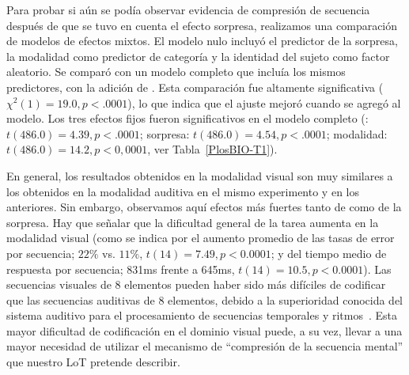 Para probar si aún se podía observar evidencia de compresión de secuencia después de que se tuvo en cuenta el efecto sorpresa, realizamos una comparación de modelos de efectos mixtos. El modelo nulo incluyó el predictor de la sorpresa, la modalidad como predictor de categoría y la identidad del sujeto como factor aleatorio. Se comparó con un modelo completo que incluía los mismos predictores, con la adición de \mdlbin. Esta comparación fue altamente significativa ($\chi^2 (1) = 19.0, p < .0001$), lo que indica que el ajuste mejoró cuando se agregó \mdlbin al modelo. Los tres efectos fijos fueron significativos en el modelo completo (\mdlbin: $t (486.0) = 4.39, p < .0001$; sorpresa: $t (486.0) = 4.54, p < .0001$; modalidad: $t (486.0) = 14.2, p <0,0001$, ver Tabla~\ref{PlosBIO-T1}).


En general, los resultados obtenidos en la modalidad visual son muy similares a los obtenidos en la modalidad auditiva en el mismo experimento y en los anteriores. Sin embargo, observamos aquí efectos más fuertes tanto de \mdlbin como de la sorpresa. Hay que señalar que la dificultad general de la tarea aumenta en la modalidad visual (como se indica por el aumento promedio de las tasas de error por secuencia; $22\%$ vs. $11 \%$, $t (14) = 7.49, p <0.0001$; y del tiempo medio de respuesta por secuencia; 831ms frente a 645ms, $t(14) = 10.5, p <0.0001$). Las secuencias visuales de 8 elementos pueden haber sido más difíciles de codificar que las secuencias auditivas de 8 elementos, debido a la superioridad conocida del sistema auditivo para el procesamiento de secuencias temporales y ritmos~\cite{f90,f92}. Esta mayor dificultad de codificación en el dominio visual puede, a su vez, llevar a una mayor necesidad de utilizar el mecanismo de ``compresión de la secuencia mental'' que nuestro LoT pretende describir.

